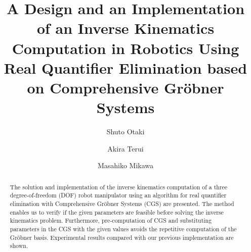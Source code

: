 \documentclass{birkjour}
\theoremstyle{plain}
\theoremstyle{definition}
\begin{document}
    
    \title[An Inverse Kinematics Computation Using Real Quantifier Elimination]{A Design and an Implementation of an Inverse Kinematics Computation 
        in Robotics
        Using Real Quantifier Elimination 
        based on Comprehensive Gr\"obner Systems}

    \author{Shuto Otaki}
    \address{
        Graduate School of Pure and Applied Sciences \\
        University of Tsukuba \\
        Tsukuba-shi, Ibaraki 305-8571 \\
        Japan\\
        Current affiliation: \\
        Tokiwa Senior High School\\
        Ota-shi, Gunma 373-0817\\
        Japan
    }

    \author{Akira Terui}
    \address{
        Faculty of Pure and Applied Sciences \\
        University of Tsukuba \\
        Tsukuba-shi, Ibaraki 305-8571 \\
        Japan
    }

    \author{Masahiko Mikawa}
    \address{
        Faculty of Library, Information and Media Science \\
        University of Tsukuba \\
        Tsukuba-shi, Ibaraki 305-8550 \\
        Japan
    }

    \begin{abstract}
        The solution and implementation of the inverse kinematics 
        computation of a three degree-of-freedom (DOF) robot manipulator using an algorithm
        for real quantifier elimination with Comprehensive Gr\"obner Systems (CGS) are presented. 
        The method enables us to verify if the given parameters are feasible before solving the
        inverse kinematics problem. 
        Furthermore, pre-computation of CGS and substituting parameters in the CGS with the given values avoids the repetitive computation of the Gr\"obner basis.
        Experimental results compared with our previous implementation are shown.
    \end{abstract}
    
\end{document}
